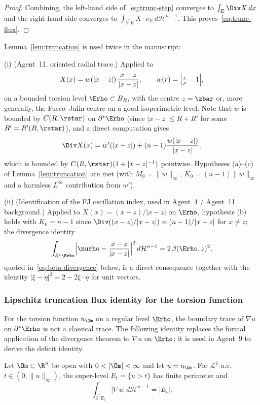 \begin{proof}
Combining, the left-hand side of~\eqref{eq:trunc-step} converges to
$\int_E\Div X\,dx$ and the right-hand side converges to
$\int_{\partial^*E}X\cdot\nu_E\,d\mathcal H^{n-1}$.
This proves~\eqref{eq:trunc-flux}.
\end{proof}

\begin{remark}\label{rem:trunc-use}
Lemma~\ref{lem:truncation} is used twice in the manuscript:

\noindent(i) (Agent~11, oriented radial trace.) Applied to
\[
   X(x)=w(|x-z|)\,\frac{x-z}{|x-z|},
   \qquad
   w(r)=\Bigl|\tfrac{r}{\rho}-1\Bigr|,
\]
on a bounded torsion level $\Erho\subset B_R$, with the centre
$z=\zbar$ or, more generally, the Fusco--Julin centre on a good
isoperimetric level.  Note that $w$ is bounded by $C(R,\rstar)$ on
$\partial^*\Erho$ (since $|x-z|\le R+R'$ for some
$R'=R'(R,\rstar)$), and a direct computation gives
\[
   \Div X(x)=w'(|x-z|)+(n-1)\frac{w(|x-z|)}{|x-z|},
\]
which is bounded by $C(R,\rstar)(1+|x-z|^{-1})$ pointwise.
Hypotheses (a)--(c) of Lemma~\ref{lem:truncation} are met (with
$M_0=\|w\|_\infty$, $K_0=(n-1)\|w\|_\infty$ and a harmless
$L^\infty$ contribution from $w'$).

\noindent(ii) (Identification of the FJ oscillation index, used in
Agent~4 / Agent~11 background.)  Applied to $X(x)=(x-z)/|x-z|$ on
$\Erho$, hypothesis (b) holds with $K_0=n-1$ since
$\Div((x-z)/|x-z|)=(n-1)/|x-z|$ for $x\ne z$; the divergence
identity
\[
   \int_{\partial^*\Erho}
      \Bigl|\nurho-\frac{x-z}{|x-z|}\Bigr|^2\,d\mathcal H^{n-1}
   =2\,\beta(\Erho,z)^2,
\]
quoted in~\eqref{eq:beta-divergence} below, is a direct consequence
together with the identity $|\xi-\eta|^2=2-2\xi\cdot\eta$ for unit
vectors.
\end{remark}

\subsubsection{Lipschitz truncation flux identity for the torsion
            function}
\label{ssec:flux-torsion}

For the torsion function $u_\Om$ on a regular level $\Erho$, the
boundary trace of $\nabla u$ on $\partial^*\Erho$ is not a classical
trace.  The following identity replaces the formal application of
the divergence theorem to $\nabla u$ on $\Erho$; it is used in
Agent~9 to derive the deficit identity.

\begin{lemma}[Flux $=$ volume; cf.\ Maggi Ch.~17]
\label{lem:flux-volume}
Let $\Om\subset\R^n$ be open with $0<|\Om|<\infty$ and let
$u=u_\Om$.  For $\mathcal L^1$-a.e.\ $t\in(0,\|u\|_\infty)$, the
super-level $E_t=\{u>t\}$ has finite perimeter and
\begin{equation}\label{eq:flux-volume}
   \int_{\partial^*E_t}|\nabla u|\,d\mathcal H^{n-1}=|E_t|.
\end{equation}
\end{lemma}

